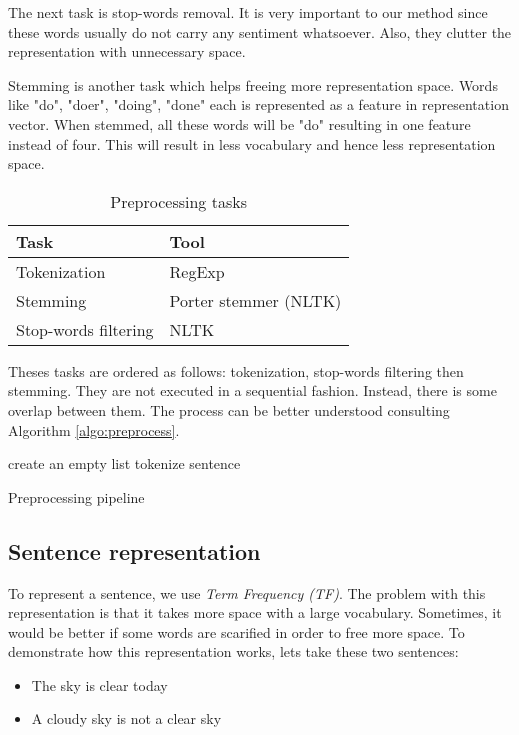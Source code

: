\documentclass[conference]{IEEEtran}
\begin{document}
The next task is stop-words removal.
It is very important to our method since these words usually do not carry any sentiment whatsoever.
Also, they clutter the representation with unnecessary space.

Stemming is another task which helps freeing more representation space.
Words like "do", "doer", "doing", "done" each is represented as a feature in representation vector.
When stemmed, all these words will be "do" resulting in one feature instead of four. 
This will result in less vocabulary and hence less representation space.

\begin{table}[htbp]
\caption{Preprocessing tasks}
\begin{center}
\begin{tabular}{ll}
\hline\hline
\textbf{Task} & \textbf{Tool}  \\
\hline
Tokenization & RegExp \\
Stemming & Porter stemmer (NLTK) \\
Stop-words filtering & NLTK \\
\hline\hline
\end{tabular}
\label{tab:preprocess}
\end{center}
\end{table}

Theses tasks are ordered as follows: tokenization, stop-words filtering then stemming.
They are not executed in a sequential fashion.
Instead, there is some overlap between them.
The process can be better understood consulting Algorithm \ref{algo:preprocess}.

\begin{algorithm}[ht]
	create an empty list\;
	tokenize sentence\;
	\caption{Preprocessing pipeline}
	\label{algo:preprocess}
\end{algorithm}

\subsection{Sentence representation}

To represent a sentence, we use \textit{Term Frequency (TF)}. 
The problem with this representation is that it takes more space with a large vocabulary.
Sometimes, it would be better if some words are scarified in order to free more space. 
To demonstrate how this representation works, lets take these two sentences:
\begin{itemize}
	\item The sky is clear today
	\item A cloudy sky is not a clear sky
\end{itemize}
\end{document}
